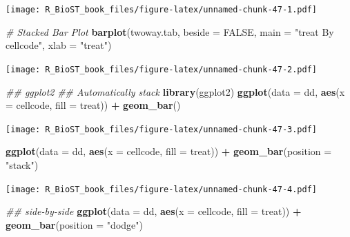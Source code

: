 \documentclass[
]{book}
\newenvironment{Shaded}{\begin{snugshade}}{\end{snugshade}}
\newcommand{\CommentTok}[1]{\textcolor[rgb]{0.56,0.35,0.01}{\textit{#1}}}
\newcommand{\DataTypeTok}[1]{\textcolor[rgb]{0.13,0.29,0.53}{#1}}
\newcommand{\KeywordTok}[1]{\textcolor[rgb]{0.13,0.29,0.53}{\textbf{#1}}}
\newcommand{\NormalTok}[1]{#1}
\newcommand{\OperatorTok}[1]{\textcolor[rgb]{0.81,0.36,0.00}{\textbf{#1}}}
\newcommand{\OtherTok}[1]{\textcolor[rgb]{0.56,0.35,0.01}{#1}}
\newcommand{\StringTok}[1]{\textcolor[rgb]{0.31,0.60,0.02}{#1}}
\begin{document}
\texttt{[image: R\_BioST\_book\_files/figure-latex/unnamed-chunk-47-1.pdf]}

\begin{Shaded}
\begin{Highlighting}[]
\CommentTok{\# Stacked Bar Plot}
\KeywordTok{barplot}\NormalTok{(twoway.tab,}
        \DataTypeTok{beside =} \OtherTok{FALSE}\NormalTok{, }
        \DataTypeTok{main =} \StringTok{"treat By cellcode"}\NormalTok{,}
        \DataTypeTok{xlab =} \StringTok{"treat"}\NormalTok{)}
\end{Highlighting}
\end{Shaded}

\texttt{[image: R\_BioST\_book\_files/figure-latex/unnamed-chunk-47-2.pdf]}

\begin{Shaded}
\begin{Highlighting}[]
\CommentTok{\#\# ggplot2}
\CommentTok{\#\# Automatically stack}
\KeywordTok{library}\NormalTok{(ggplot2)}
\KeywordTok{ggplot}\NormalTok{(}\DataTypeTok{data =}\NormalTok{ dd, }\KeywordTok{aes}\NormalTok{(}\DataTypeTok{x =}\NormalTok{ cellcode, }\DataTypeTok{fill =}\NormalTok{ treat)) }\OperatorTok{+}\StringTok{ }
\StringTok{  }\KeywordTok{geom\_bar}\NormalTok{()}
\end{Highlighting}
\end{Shaded}

\texttt{[image: R\_BioST\_book\_files/figure-latex/unnamed-chunk-47-3.pdf]}

\begin{Shaded}
\begin{Highlighting}[]
\KeywordTok{ggplot}\NormalTok{(}\DataTypeTok{data =}\NormalTok{ dd, }\KeywordTok{aes}\NormalTok{(}\DataTypeTok{x =}\NormalTok{ cellcode, }\DataTypeTok{fill =}\NormalTok{ treat)) }\OperatorTok{+}
\StringTok{  }\KeywordTok{geom\_bar}\NormalTok{(}\DataTypeTok{position =} \StringTok{"stack"}\NormalTok{)}
\end{Highlighting}
\end{Shaded}

\texttt{[image: R\_BioST\_book\_files/figure-latex/unnamed-chunk-47-4.pdf]}

\begin{Shaded}
\begin{Highlighting}[]
\CommentTok{\#\# side{-}by{-}side }
\KeywordTok{ggplot}\NormalTok{(}\DataTypeTok{data =}\NormalTok{ dd, }\KeywordTok{aes}\NormalTok{(}\DataTypeTok{x =}\NormalTok{ cellcode, }\DataTypeTok{fill =}\NormalTok{ treat)) }\OperatorTok{+}\StringTok{ }
\StringTok{  }\KeywordTok{geom\_bar}\NormalTok{(}\DataTypeTok{position =} \StringTok{"dodge"}\NormalTok{)}
\end{Highlighting}
\end{Shaded}
\end{document}
